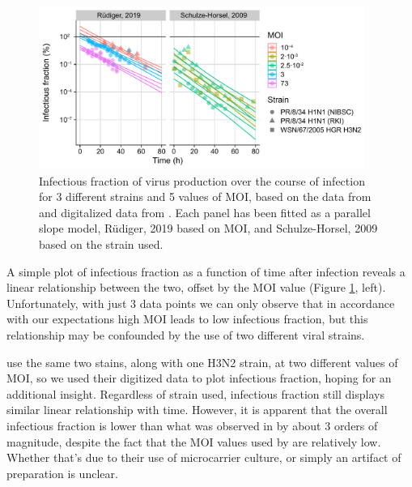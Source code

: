 \begin{figure}
\begin{center}
\includegraphics[width=0.95\textwidth, trim={0cm 0cm 0cm 0cm}, clip]{D_chapters/3_DARPinModels/InfectiousFractionAll.pdf}
\caption[Infectious fraction of virus production over the course of infection]%
{Infectious fraction of virus production over the course of infection for 3 different strains and 5 values of MOI, based on the data from \cite{frensing2016influenza, rudiger2019multiscale} and digitalized data from \cite{schulze2009infection}. Each panel has been fitted as a parallel slope model, R\"udiger, 2019 based on MOI, and Schulze-Horsel, 2009 based on the strain used.}
\label{figure:infectiousFraction}
\end{center}
\end{figure}

A simple plot of infectious fraction \cite{rudiger2019multiscale, frensing2016influenza} as a function of time after infection reveals a linear relationship between the two, offset by the MOI value (Figure \ref{figure:infectiousFraction}, left). Unfortunately, with just 3 data points we can only observe that in accordance with our expectations high MOI  leads to low infectious fraction, but this relationship may be confounded by the use of two different viral strains.

\cite{schulze2009infection} use the same two stains, along with one H3N2 strain, at two different values of MOI, so we used their digitized data to plot infectious fraction, hoping for an additional insight. Regardless of strain used, infectious fraction still displays similar linear relationship with time. However, it is apparent that the overall infectious fraction is lower than what was observed in \cite{rudiger2019multiscale, frensing2016influenza} by about 3 orders of magnitude, despite the fact that the MOI values used by \cite{schulze2009infection} are relatively low. Whether that's due to their use of microcarrier culture, or simply an artifact of preparation is unclear.

